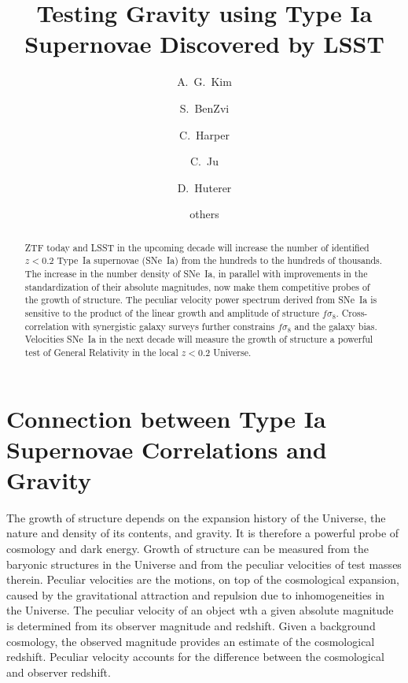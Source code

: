 \documentclass{aastex62}   	%
\begin{document}
\title{Testing Gravity using Type Ia Supernovae Discovered by LSST}
\author[0000-0001-6315-8743]{A.~G.~Kim}
\author{S.~BenZvi}
\author{C.~Harper}
\author{C.~Ju}
\author{D.~Huterer}

\author{others}


\begin{abstract}
ZTF today and LSST in the upcoming decade will increase the number of identified  $z<0.2$ Type~Ia supernovae (SNe~Ia)  from the hundreds to the
hundreds of thousands.  The increase in the number density of SNe~Ia, in parallel with improvements in the standardization of
their absolute magnitudes, now make them competitive probes of the growth of structure.  The peculiar velocity power spectrum derived from SNe~Ia
is sensitive to the product of the linear growth and amplitude of structure
$f\sigma_8$.  Cross-correlation with synergistic galaxy surveys further constrains $f \sigma_8$ and the galaxy bias.  Velocities
SNe~Ia in the next decade will measure the growth of structure  a powerful test of General Relativity in the local $z<0.2$ Universe.
\end{abstract}

\section{Connection between Type Ia Supernovae Correlations and Gravity}

The growth of structure depends on the expansion history of the Universe, the nature and density of its contents, and gravity. 
It is therefore a powerful probe of cosmology and dark energy.  Growth of structure can be measured from the baryonic structures
in the Universe and from the peculiar velocities of test masses therein.
Peculiar velocities are the motions, on top of the cosmological expansion, caused by the gravitational attraction
and repulsion due to inhomogeneities in the Universe.  The peculiar velocity of an object wth a given absolute magnitude
is determined from its observer magnitude and redshift.  Given a background cosmology, the observed magnitude provides
an estimate of the cosmological redshift.  Peculiar velocity accounts for the difference between the cosmological and observer redshift.
\end{document}
